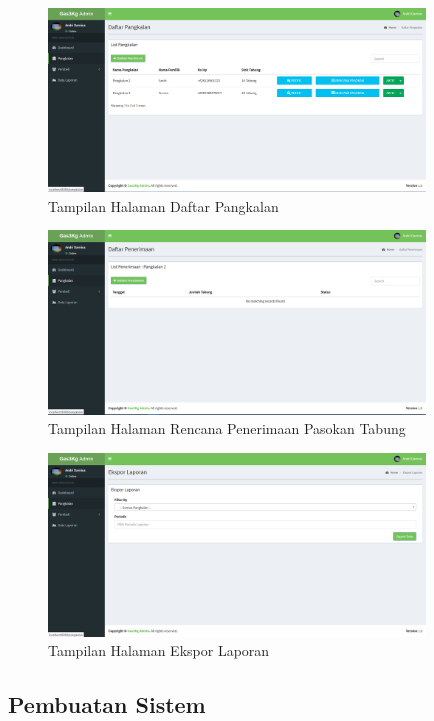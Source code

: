 	\begin{figure}[H]
		\center
		\includegraphics [width = 10cm]{gambar/web/pangkalan}
		\caption{Tampilan Halaman Daftar Pangkalan }
		\label{tampilanDaftarPangkalanAgen}
	\end{figure}

	\begin{figure}[H]
		\center
		\includegraphics [width = 10cm]{gambar/web/penerimaan}
		\caption{Tampilan Halaman Rencana Penerimaan Pasokan Tabung}
		\label{tampilanPenerimaanAgen}
	\end{figure}

	\begin{figure}[H]
		\center
		\includegraphics [width = 10cm]{gambar/web/Laporan}
		\caption{Tampilan Halaman Ekspor Laporan}
		\label{tampilanLaporanAgen}
	\end{figure}
	
	
	
	\subsection{Pembuatan Sistem}
	

